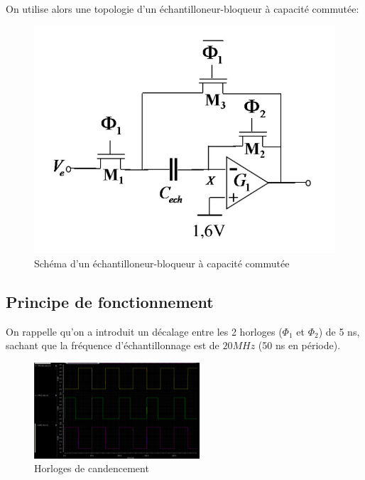 \documentclass[11pt]{article}
\begin{document}
On utilise alors une topologie d'un \'echantilloneur-bloqueur \`a capacit\'e commut\'ee:

\begin{figure}[!htb]
\begin{center}
  \includegraphics[scale=0.30]{Echantillonneur-bloqueur.jpg}
  \caption{Sch\'ema d'un \'echantilloneur-bloqueur \`a capacit\'e commut\'ee}
\end{center}
\end{figure}

\subsection{Principe de fonctionnement}

On rappelle qu'on a introduit un d\'ecalage entre les 2 horloges ($\Phi_1$ et $\Phi_2$) de 5 ns, sachant que la
fr\'equence d'\'echantillonnage est de $20 MHz$ (50 ns en p\'eriode).

\begin{figure}
\begin{center}
  \includegraphics[width=0.55\textwidth]{clocks_.png}
\end{center}
\caption{Horloges de candencement}
\end{figure}
\end{document}
